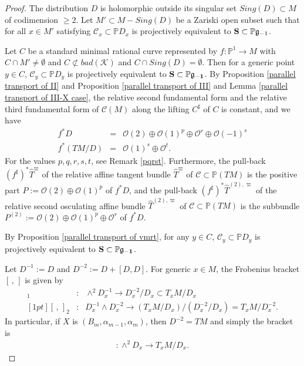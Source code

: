 \documentclass[12pt]{amsart}
\theoremstyle{plain}
\theoremstyle{definition}
\begin{document}
\begin{proof}
The distribution $D$ is holomorphic outside its singular set $Sing(D) \subset M$ of codimension $\geq 2$.
 Let $M' \subset M-Sing(D)$ be a  Zariski open subset such that for all $x \in M'$ satisfying $\mathcal C_x \subset \mathbb P D_x$ is projectively equivalent to $ {\bf S} \subset \mathbb P {\frak g_{-1}}$.

Let $C $ be a standard minimal rational curve represented by $f:\mathbb P^1 \rightarrow M$ with $C \cap M' \not = \emptyset$ and $C \not\subset bad(\mathcal K)$ and  $C \cap Sing(D) =\emptyset$. Then for a generic point $y \in C$, $\mathcal C_y \subset \mathbb PD_y$ is projectively equivalent to $\bf S\subset \mathbb P \frak g_{-1}$. By Proposition \ref{parallel transport of II} and Proposition \ref{parallel transport of III} and Lemma  \ref{parallel transport of III-X case}, the relative second fundamental form and the relative third fundamental form of $\mathcal C(M)$ along the lifting $C^{\sharp}$ of $C$ is constant, and we have %
\begin{eqnarray*}
f^*D &=& \mathcal O(2) \oplus \mathcal O(1)^p \oplus \mathcal O^r \oplus \mathcal O(-1)^s \\
f^*(TM/D) &=& \mathcal O(1)^s \oplus \mathcal O^t.
\end{eqnarray*}
For the values $p,q,r,s,t$, see Remark \ref{pqrst}.
Furthermore,
the pull-back $(f^{\sharp})^*\widehat{T}^{\varpi} $ of the relative affine tangent bundle $ \widehat{T}^{\varpi} $ of $\mathcal C \subset \mathbb P(TM)$ is the positive part $ P:=\mathcal O(2) \oplus \mathcal O(1)^p$ of $f^*D$, and
   the pull-back $(f^{\sharp})^*\widehat{T}^{(2), \varpi} $ of the relative  second osculating affine   bundle   $ \widehat{T}^{(2), \varpi} $ of $\mathcal C \subset \mathbb P(TM)$  is the subbundle  $P^{(2)} :=\mathcal O(2) \oplus \mathcal O(1)^p \oplus \mathcal O^r$ of $f^*D$. %

 By Proposition \ref{parallel transport of vmrt}, for any $y\in C$, $\mathcal C_y \subset \mathbb PD_y$ is projectively equivalent to $\bf S\subset \mathbb P \frak g_{-1}$.

Let $D^{-1} :=D$ and $D^{-2} := D + [D,D]$. For generic $x \in M$, the Frobenius bracket $ [\,,\,]$ is given by
\begin{eqnarray*}
    [\,,\,]_1&:&\wedge^2 D_x^{-1} \rightarrow D_x^{-2}/D_x \subset T_xM/D_x \\ [1 pt]
    [\,,\,]_2&:&D_x^{-1} \wedge D_x^{-2} \rightarrow (T_xM/D_x)/(D_x^{-2}/D_x)= T_xM/D_x^{-2}.
    \end{eqnarray*}
In particular, if $X$ is $(B_m, \alpha_{m-1}, \alpha_m)$, then $D^{-2}=TM$ and simply the bracket is
    \begin{eqnarray*} [\,,\,]:\wedge^2 D_x \rightarrow T_xM/D_x.
    \end{eqnarray*}


\end{proof}
\end{document}
